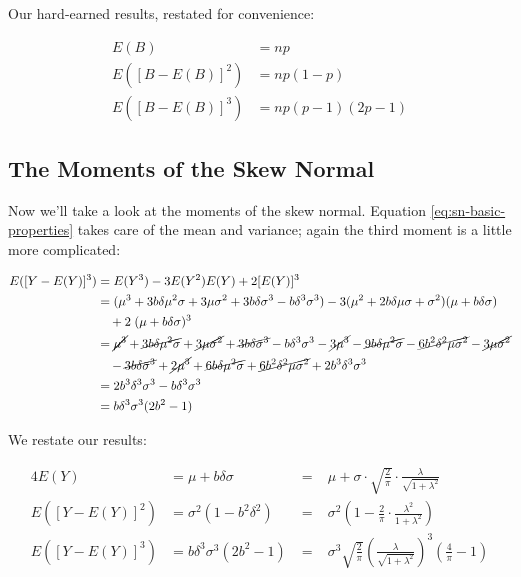 Our hard-earned results, restated for convenience:

\begin{align}
  E(B) &= np \nonumber \\
  E([B - E(B)]^2) &= np(1-p) \\
  E([B - E(B)]^3) &= np(p-1)(2p-1) \nonumber
\end{align}

\subsection{The Moments of the Skew Normal}

Now we'll take a look at the moments of the skew normal. Equation
\eqref{eq:sn-basic-properties} takes care of the mean and variance; again the
third moment is a little more complicated:

\begin{align*}
  E([Y - E(Y)]^3) &= E(Y^3) - 3E(Y^2)E(Y) + 2[E(Y)]^3 \\
  &= (\mu^3 + 3 b \delta \mu^2 \sigma + 3 \mu \sigma^2 + 3 b \delta \sigma^3 - b \delta^3 \sigma^3) - 3 (\mu^2 + 2b \delta \mu \sigma + \sigma^2) (\mu + b \delta \sigma) \\
  & \quad + 2\;(\mu + b \delta \sigma)^3 \\
  &= \cancel{\mu^3} + \cancel{3 b \delta \mu^2 \sigma} + \cancel{3 \mu \sigma^2} + \cancel{3 b \delta \sigma^3} - b \delta^3 \sigma^3 - \cancel{3 \mu^3} - \cancel{9 b \delta \mu^2 \sigma} -
    \cancel{6 b^2 \delta^2 \mu \sigma^2} - \cancel{3 \mu \sigma^2} \\
  & \quad - \cancel{3 b \delta \sigma^3} + \cancel{2 \mu^3} + \cancel{6 b \delta \mu^2 \sigma} + \cancel{6 b^2 \delta^2 \mu \sigma^2} + 2 b^3 \delta^3 \sigma^3 \\
  &= 2 b^3 \delta^3 \sigma^3 - b \delta^3 \sigma^3 \\
  &= b \delta^3 \sigma^3 (2b^2 - 1)
\end{align*}

We restate our results:

\begin{alignat}{4}
  E(Y) &= \mu + b \delta \sigma \;&=&\; \mu + \sigma \cdot \sqrt{\frac{2}{\pi}} \cdot \frac{\lambda}{\sqrt{1 + \lambda^2}} \nonumber \\
  E([Y - E(Y)]^2) &= \sigma^2 (1 - b^2 \delta^2) \;&=&\; \sigma^2 \left( 1 - \frac{2}{\pi} \cdot \frac{\lambda^2}{1 + \lambda^2} \right) \\
  E([Y - E(Y)]^3) &= b \delta^3 \sigma^3 (2b^2 - 1) \;&=&\; \sigma^3 \sqrt{\frac{2}{\pi}} \left( \frac{\lambda}{\sqrt{1 + \lambda^2}} \right)^3 \left( \frac{4}{\pi} - 1 \right) \nonumber
\end{alignat}

